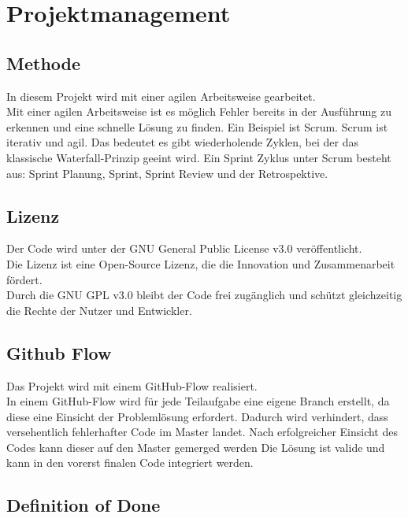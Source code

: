\chapter{Projektmanagement}\label{ch:projektmanagement}

\section{Methode}\label{sec:methode}

In diesem Projekt wird mit einer agilen Arbeitsweise gearbeitet.\\
Mit einer agilen Arbeitsweise ist es möglich Fehler bereits in der Ausführung zu erkennen und eine schnelle Lösung zu finden.
Ein Beispiel ist Scrum. Scrum ist iterativ und agil. Das bedeutet es gibt wiederholende Zyklen, bei der das klassische Waterfall-Prinzip geeint wird.
Ein Sprint Zyklus unter Scrum besteht aus: Sprint Planung, Sprint, Sprint Review und der Retrospektive.

\section{Lizenz}\label{sec:lizenz}

Der Code wird unter der GNU General Public License v3.0 veröffentlicht.\\
Die Lizenz ist eine Open-Source Lizenz, die die Innovation und Zusammenarbeit fördert.\\
Durch die GNU GPL v3.0 bleibt der Code frei zugänglich und schützt gleichzeitig die Rechte der Nutzer und Entwickler.  


\section{Github Flow}\label{sec:github-flow}

Das Projekt wird mit einem GitHub-Flow realisiert.\\
In einem GitHub-Flow wird für jede Teilaufgabe eine eigene Branch erstellt, da diese eine Einsicht der Problemlösung erfordert.
Dadurch wird verhindert, dass versehentlich fehlerhafter Code im Master landet. Nach erfolgreicher Einsicht des Codes kann dieser auf den Master gemerged werden \dah{} Die Lösung ist valide und kann in den vorerst finalen Code integriert werden.



\section{Definition of Done}\label{sec:dod}

